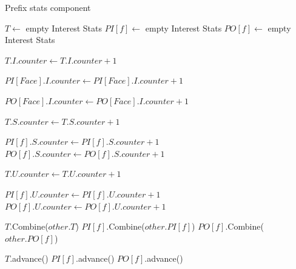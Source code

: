 
\begin{algorithm}[h]
\caption{Prefix stats component}
\label{algo:prefix stats}
\begin{algorithmic}[1]
\State $T \leftarrow$ empty Interest Stats 
    \State $PI[f] \leftarrow$ empty Interest Stats 
    \State $PO[f] \leftarrow$ empty Interest Stats 
\EndFor


\vspace{0.2cm}
  \State $T.I.counter \leftarrow T.I.counter + 1$ %
\EndFunction

\vspace{0.2cm}
  \State $PI[Face].I.counter \leftarrow PI[Face].I.counter + 1$
\EndFunction

\vspace{0.2cm}
  \State $PO[Face].I.counter \leftarrow PO[Face].I.counter + 1$
\EndFunction

\vspace{0.2cm}
  \State $T.S.counter \leftarrow T.S.counter + 1$ %

    \State $PI[f].S.counter \leftarrow PI[f].S.counter + 1$
    \State $PO[f].S.counter \leftarrow PO[f].S.counter + 1$
  \EndFor
\EndFunction

\vspace{0.2cm}
    \State $T.U.counter \leftarrow T.U.counter + 1$ %

        \State $PI[f].U.counter \leftarrow PI[f].U.counter + 1$
        \State $PO[f].U.counter \leftarrow PO[f].U.counter + 1$
    \EndFor
\EndFunction

\vspace{0.2cm}
    \State $T.$Combine($other.T$)
        \State $PI[f].$Combine($other.PI[f]$)
        \State $PO[f].$Combine($other.PO[f]$)
    \EndFor
\EndFunction

\vspace{0.2cm}
 
\State $T.$advance()
    \State $PI[f].$advance()
    \State $PO[f].$advance()
\EndFor

\EndFunction

\end{algorithmic}
\end{algorithm}

